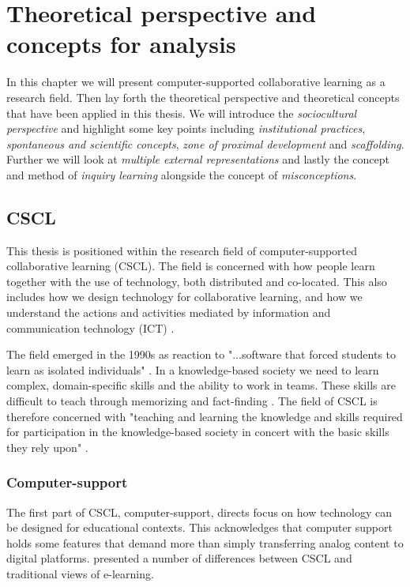 \chapter{Theoretical perspective and concepts for analysis}

In this chapter we will present computer-supported collaborative learning as a research field. Then lay forth the theoretical perspective and theoretical concepts that have been applied in this thesis. We will introduce the \emph{sociocultural perspective} and highlight some key points including \emph{institutional practices}, \emph{spontaneous and scientific concepts}, \emph{zone of proximal development} and \emph{scaffolding}. Further we will look at \emph{multiple external representations} and lastly the concept and method of \emph{inquiry learning} alongside the concept of \emph{misconceptions}.

\section{CSCL}
This thesis is positioned within the research field of computer-supported collaborative learning (CSCL). The field is concerned with how people learn together with the use of technology, both distributed and co-located. This also includes how we design technology for collaborative learning, and how we understand the actions and activities mediated by information and communication technology (ICT) \citep{stahl2006computer,ludvigsen2010computer}.  

The field emerged in the 1990s as reaction to "...software that forced students to learn as isolated individuals" \citep{stahl2006computer}. In a knowledge-based society we need to learn complex, domain-specific skills and the ability to work in teams. These skills are difficult to teach through memorizing and fact-finding \citep{sfard1998two,ludvigsen2010computer}. The field of CSCL is therefore concerned with "teaching and learning the knowledge and skills required for participation in the knowledge-based society in concert with the basic skills they rely upon" \citep[p. 2]{ludvigsen2010computer}.

\subsection{Computer-support}
The first part of CSCL, computer-support, directs focus on how technology can be designed for educational contexts. This acknowledges that computer support holds some features that demand more than simply transferring analog content to digital platforms. \citet{stahl2006computer} presented a number of differences between CSCL and traditional views of e-learning. 


